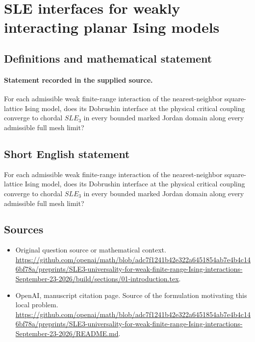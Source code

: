 \documentclass[11pt]{article}
\begin{document}
\section*{SLE interfaces for weakly interacting planar Ising models}\label{statement}
\subsection{Definitions and mathematical statement}
\paragraph{Statement recorded in the supplied source.}
For each admissible weak finite-range interaction of the nearest-neighbor square-lattice Ising model, does its Dobrushin interface at the physical critical coupling converge to chordal $SLE_3$ in every bounded marked Jordan domain along every admissible full mesh limit?
\subsection{Short English statement}
For each admissible weak finite-range interaction of the nearest-neighbor square-lattice Ising model, does its Dobrushin interface at the physical critical coupling converge to chordal $SLE_3$ in every bounded marked Jordan domain along every admissible full mesh limit?
\subsection{Sources}
\begin{itemize}
\item[S1] Original question source or mathematical context.
\url{https://github.com/openai/math/blob/adc7f1241b42e322a6451854ab7e4b4c146bf78a/preprints/SLE3-universality-for-weak-finite-range-Ising-interactions-September-23-2026/build/sections/01-introduction.tex}.
\item[S2] OpenAI, manuscript citation page. Source of the formulation motivating this local problem.
\url{https://github.com/openai/math/blob/adc7f1241b42e322a6451854ab7e4b4c146bf78a/preprints/SLE3-universality-for-weak-finite-range-Ising-interactions-September-23-2026/README.md}.
\end{itemize}
\end{document}
